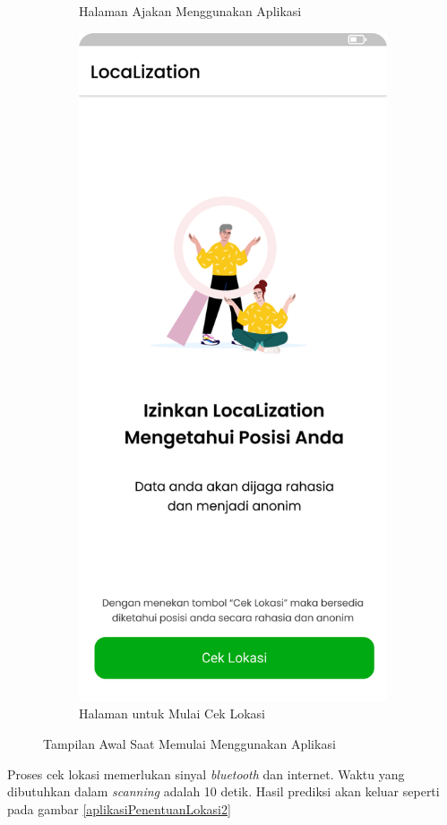 \begin{enumerate}[a.]
\begin{figure} [H]
\begin{subfigure}{.5\textwidth}
			      \caption{Halaman Ajakan Menggunakan Aplikasi}
		      \end{subfigure}
		      \vspace{1cm}
		      \newline
		      \begin{center}
			      \begin{subfigure}{.5\textwidth}
				      \centering
				      \includegraphics[width=.5\linewidth]{gambar/mulai (1).png}
				      \caption{Halaman untuk Mulai Cek Lokasi}
			      \end{subfigure}
		      \end{center}
		      \vspace{0.5cm}
		      \caption{Tampilan Awal Saat Memulai Menggunakan Aplikasi}
		      \label{aplikasiPenentuanLokasi}
	      \end{figure}

	      \vspace{0.5cm}

	      \par Proses cek lokasi memerlukan sinyal \textit{bluetooth} dan internet. Waktu yang dibutuhkan dalam \textit{scanning} adalah 10 detik. Hasil prediksi akan keluar seperti pada gambar \ref{aplikasiPenentuanLokasi2}


\end{enumerate}

